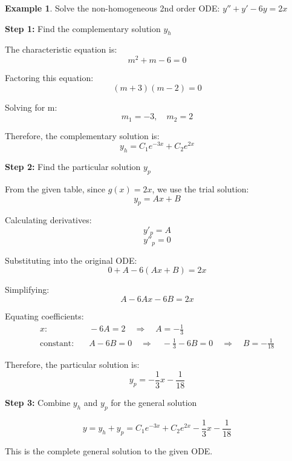 \documentclass{article}
\theoremstyle{definition}
\newtheorem{example}{Example}[section]
\begin{document}
\begin{example}
    Solve the non-homogeneous 2nd order ODE: $y'' + y' - 6y = 2x$
    
    \textbf{Step 1:} Find the complementary solution $y_h$
    
    The characteristic equation is:
    \[ m^2 + m - 6 = 0 \]
    
    Factoring this equation:
    \[ (m+3)(m-2) = 0 \]
    
    Solving for m:
    \[ m_1 = -3, \quad m_2 = 2 \]
    
    Therefore, the complementary solution is:
    \[ y_h = C_1e^{-3x} + C_2e^{2x} \]
    
    \textbf{Step 2:} Find the particular solution $y_p$
    
    From the given table, since $g(x) = 2x$, we use the trial solution:
    \[ y_p = Ax + B \]
    
    Calculating derivatives:
    \[ y'_p = A \]
    \[ y''_p = 0 \]
    
    Substituting into the original ODE:
    \[ 0 + A - 6(Ax + B) = 2x \]
    
    Simplifying:
    \[ A - 6Ax - 6B = 2x \]
    
    Equating coefficients:
    \begin{align*}
    x: & \quad -6A = 2 \quad \Rightarrow \quad A = -\frac{1}{3} \\
    \text{constant}: & \quad A - 6B = 0 \quad \Rightarrow \quad -\frac{1}{3} - 6B = 0 \quad \Rightarrow \quad B = -\frac{1}{18}
    \end{align*}
    
    Therefore, the particular solution is:
    \[ y_p = -\frac{1}{3}x - \frac{1}{18} \]
    
    \textbf{Step 3:} Combine $y_h$ and $y_p$ for the general solution
    
    \[ y = y_h + y_p = C_1e^{-3x} + C_2e^{2x} - \frac{1}{3}x - \frac{1}{18} \]
    
    This is the complete general solution to the given ODE.
    \end{example}
    
\end{document}
